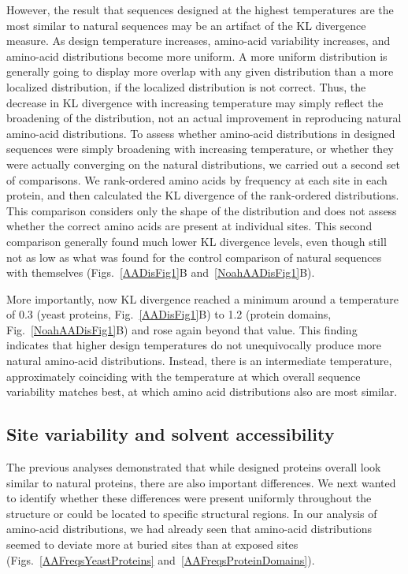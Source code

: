 \documentclass[12pt]{article}
\begin{document}
However, the result that sequences designed at the highest temperatures are the most similar to natural sequences may be an artifact of the KL divergence measure. As design temperature increases, amino-acid variability increases, and amino-acid distributions become more uniform. A more uniform distribution is generally going to display more overlap with any given distribution than a more localized distribution, if the localized distribution is not correct. Thus, the decrease in KL divergence with increasing temperature may simply reflect the broadening of the distribution, not an actual improvement in reproducing natural amino-acid distributions. To assess whether amino-acid distributions in designed sequences were simply broadening with increasing temperature, or whether they were actually converging on the natural distributions, we carried out a second set of comparisons. We rank-ordered amino acids by frequency at each site in each protein, and then calculated the KL divergence of the rank-ordered distributions. This comparison considers only the shape of the distribution and does not assess whether the correct amino acids are present at individual sites. This second comparison generally found much lower KL divergence levels, even though still not as low as what was found for the control comparison of natural sequences with themselves (Figs.~\ref{AADisFig1}B and~\ref{NoahAADisFig1}B). 

More importantly, now KL divergence reached a minimum around a temperature of 0.3 (yeast proteins, Fig.~\ref{AADisFig1}B) to 1.2 (protein domains, Fig.~\ref{NoahAADisFig1}B) and rose again beyond that value. This finding indicates that higher design temperatures do not unequivocally produce more natural amino-acid distributions. Instead, there is an intermediate temperature, approximately coinciding with the temperature at which overall sequence variability matches best, at which amino acid distributions also are most similar.

\subsection{Site variability and solvent accessibility}
\label{ProteinStructure}

The previous analyses demonstrated that while designed proteins overall look similar to natural proteins, there are also important differences. We next wanted to identify whether these differences were present uniformly throughout the structure or could be located to specific structural regions. In our analysis of amino-acid distributions, we had already seen that amino-acid distributions seemed to deviate more at buried sites than at exposed sites (Figs.~\ref{AAFreqsYeastProteins} and~\ref{AAFreqsProteinDomains}).
\end{document}
